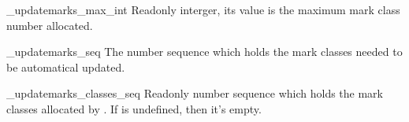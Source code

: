\documentclass{l3doc}
\begin{document}
\begin{function}{\g_updatemarks_max_int}
Readonly interger, its value is the maximum mark class number allocated.
\end{function}

\begin{function}{\g_updatemarks_seq}
The number sequence which holds the mark classes needed to be automatical updated.
\end{function}

\begin{function}{\g_updatemarks_classes_seq}
Readonly number sequence which holds the mark classes allocated by 
. If  is undefined, then it's empty.
\end{function}
\end{document}
